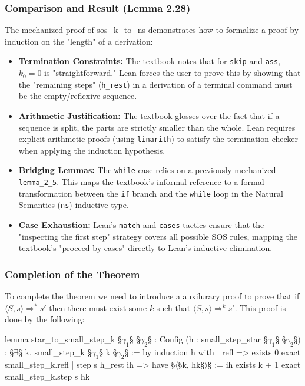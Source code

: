 \subsubsection*{Comparison and Result (Lemma 2.28)}
The mechanized proof of sos\_k\_to\_ns demonstrates how to formalize a proof
by induction on the "length" of a derivation:

\begin{itemize}
    \item \textbf{Termination Constraints:}
    The textbook notes that for \texttt{skip} and \texttt{ass}, $k_0 = 0$ is
    "straightforward." Lean forces the user to prove this by showing that the
    "remaining steps" (\texttt{h\_rest}) in a derivation of a terminal command
    must be the empty/reflexive sequence.
    
    \item \textbf{Arithmetic Justification:}
    The textbook glosses over the fact that if a sequence is split, the parts
    are strictly smaller than the whole. Lean requires explicit arithmetic
    proofs (using \texttt{linarith}) to satisfy the termination checker when
    applying the induction hypothesis.
    
    \item \textbf{Bridging Lemmas:}
    The \texttt{while} case relies on a previously mechanized
    \texttt{lemma\_2\_5}. This maps the textbook's informal reference to a
    formal transformation between the \texttt{if} branch and the
    \texttt{while} loop in the Natural Semantics (\texttt{ns}) inductive type.
    
    \item \textbf{Case Exhaustion:}
    Lean's \texttt{match} and \texttt{cases} tactics ensure that the "inspecting
    the first step" strategy covers all possible SOS rules, mapping the
    textbook's "proceed by cases" directly to Lean's inductive elimination.
\end{itemize}

\subsubsection*{Completion of the Theorem}
To complete the theorem we need to introduce a auxilurary proof to prove that
if \(\langle S, s \rangle \Rightarrow^* s'\) then there must exist some \(k\)
such that \(\langle S, s \rangle \Rightarrow^k s'\).
This proof is done by the following:
\begin{Lean_Code}
lemma star_to_small_step_k {§\(\gamma_1\)§ §\(\gamma_2\)§ : Config}
  (h : small_step_star §\(\gamma_1\)§ §\(\gamma_2\)§) : §\(\exists\)§ k, small_step_k §\(\gamma_1\)§ k §\(\gamma_2\)§ := by
  induction h with
  | refl =>
    exists 0
    exact small_step_k.refl
  | step s h_rest ih =>
    have §\(\langle\)§k, hk§\(\rangle\)§ := ih
    exists k + 1
    exact small_step_k.step s hk
\end{Lean_Code}

